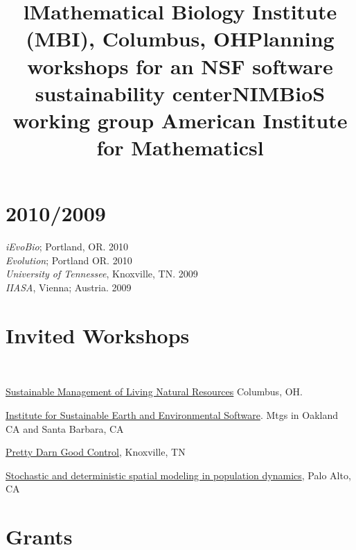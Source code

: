 \documentclass[margin]{res}
\begin{document}
\begin{resume}
 \section{\textnormal{2010/2009}}
  \emph{iEvoBio}; Portland, OR. 2010 \\
  \emph{Evolution}; Portland OR. 2010 \\
 \emph{University of Tennessee}, Knoxville, TN. 2009 \\
 \emph{IIASA}, Vienna; Austria. 2009


\section{Invited Workshops}
\begin{format}
\title{l} \\
\body
\end{format}

\title{Mathematical Biology Institute (MBI), Columbus, OH}
\begin{position}
\href{http://www.mbi.ohio-state.edu/2013/ws3description.html}{Sustainable Management of Living Natural Resources} Columbus, OH.  
\vspace{-.25cm}
\end{position}

\title{Planning workshops for an NSF software sustainability center}
\begin{position}
\href{http://isees.nceas.ucsb.edu}{Institute for Sustainable Earth and Environmental Software}. Mtgs in Oakland CA and Santa Barbara, CA
\vspace{-.25cm}
\end{position}



\title{NIMBioS working group }
\begin{position}
\href{http://www.nimbios.org/workinggroups/WG_PDG}{Pretty Darn Good Control}, Knoxville, TN  
\vspace{-.25cm}
\end{position}

\title{American Institute for Mathematics}
\begin{position}
 \href{http://www.aimath.org/WWN/populationmodel}{Stochastic and deterministic spatial modeling in population dynamics}, Palo Alto, CA  \vspace{-.25cm}
\end{position}

 
\section{Grants}
\begin{format}
\title{l} \\
\body
\end{format}


\end{resume}
\end{document}
